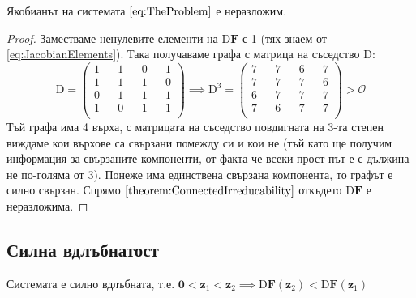 \begin{proposition}
  Якобианът на системата $\ref{eq:TheProblem}$ е неразложим.
\end{proposition}
\begin{proof}
  Заместваме ненулевите елементи на $\mathrm{D} \mathbf{F}$ с 1 (тях знаем от \ref{eq:JacobianElements}). Така получаваме графа с матрица на съседство $\mathrm{D}$:
  \begin{equation}
    \mathrm{D} =
    \begin{pmatrix}
      1 && 1 && 0 && 1 \\
      1 && 1 && 1 && 0 \\
      0 && 1 && 1 && 1 \\
      1 && 0 && 1 && 1 \\
    \end{pmatrix}
    \implies
    \mathrm{D}^3 =
    \begin{pmatrix}
      7 && 7 && 6 && 7 \\
      7 && 7 && 7 && 6 \\
      6 && 7 && 7 && 7 \\
      7 && 6 && 7 && 7 \\
    \end{pmatrix}
    >
    \mathscr{O}
  \end{equation}
  Тъй графа има 4 върха, с матрицата на съседство повдигната на 3-та степен виждаме кои върхове са свързани помежду си и кои не (тъй като ще получим информация за свързаните компоненти, от факта че всеки прост път е с дължина не по-голяма от 3).
  Понеже има единствена свързана компонента, то графът е силно свързан.
  Спрямо $\ref{theorem:ConnectedIrreducability}$ откъдето $\mathrm{D}\mathbf{F}$ е неразложима.
  \end{proof}

\subsection{Силна вдлъбнатост}
\begin{proposition}
  Системата е силно вдлъбната, т.е. $\mathbf{0} < \mathbf{z}_1 < \mathbf{z}_2 \implies \mathrm{D}\mathbf{F}(\mathbf{z}_2) < \mathrm{D}\mathbf{F}(\mathbf{z}_1)$
\end{proposition}

